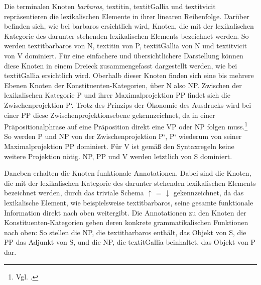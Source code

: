 \documentclass[12pt,a4paper]{article}
\begin{document}
Die terminalen Knoten \textit{barbaros}, textit{in}, textit{Gallia} und textit{vicit} repräsentieren die lexikalischen Elemente in ihrer linearen Reihenfolge. Darüber befinden sich, wie bei barbaros ersichtlich wird, Knoten, die mit der lexikalischen Kategorie des darunter stehenden lexikalischen Elements bezeichnet werden. So werden textit{barbaros} von N, textit{in} von P, textit{Gallia} von N und textit{vicit} von V dominiert. Für eine einfachere und übersichtlichere Darstellung können diese Knoten in einem Dreieck zusammengefasst dargestellt werden, wie bei textit{Gallia} ersichtlich wird. Oberhalb dieser Knoten finden sich eine bis mehrere Ebenen Knoten der Konstituenten-Kategorien, über N also NP. Zwischen der lexikalischen Kategorie P und ihrer Maximalprojektion PP findet sich die Zwischenprojektion P‘. Trotz des Prinzips der Ökonomie des Ausdrucks wird bei einer PP diese Zwischenprojektionsebene gekennzeichnet,  da in einer Präpositionalphrase auf eine Präposition direkt eine VP oder NP folgen muss.\footnote{Vgl. \cite{Snijders}.} So werden P und NP von der Zwischenprojektion P‘, P‘ wiederum von seiner Maximalprojektion PP dominiert. Für V ist gemäß den Syntaxregeln keine weitere Projektion nötig. NP, PP und V werden letztlich von S dominiert.

Daneben erhalten die Knoten funktionale Annotationen. Dabei sind die Knoten, die mit der lexikalischen Kategorie des darunter stehenden lexikalischen Elements bezeichnet werden, durch das triviale Schema $\uparrow$ = $\downarrow$ gekennzeichnet, da das lexikalische Element, wie beispielsweise textit{barbaros}, seine gesamte funktionale Information direkt nach oben weitergibt. Die Annotationen zu den Knoten der Konstituenten-Kategorien geben deren konkrete grammatikalischen Funktionen nach oben: So stellen die NP, die textit{barbaros} enthält, das Objekt von S, die PP das Adjunkt von S, und die NP, die textit{Gallia} beinhaltet, das Objekt von P dar.
\end{document}
